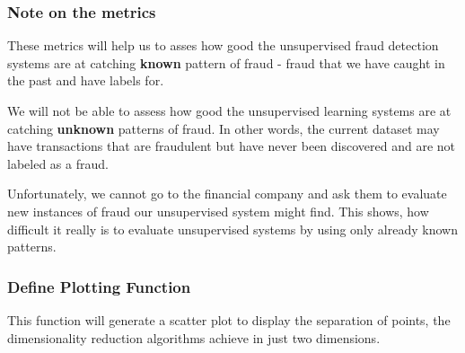 \documentclass[11pt]{article}
\begin{document}
    \subsubsection{Note on the metrics}\label{note-on-the-metrics}

These metrics will help us to asses how good the unsupervised fraud
detection systems are at catching \textbf{known} pattern of fraud -
fraud that we have caught in the past and have labels for.

We will not be able to assess how good the unsupervised learning systems
are at catching \textbf{unknown} patterns of fraud. In other words, the
current dataset may have transactions that are fraudulent but have never
been discovered and are not labeled as a fraud.

Unfortunately, we cannot go to the financial company and ask them to
evaluate new instances of fraud our unsupervised system might find. This
shows, how difficult it really is to evaluate unsupervised systems by
using only already known patterns.

    \subsubsection{Define Plotting Function}\label{define-plotting-function}

This function will generate a scatter plot to display the separation of
points, the dimensionality reduction algorithms achieve in just two
dimensions.
\end{document}
